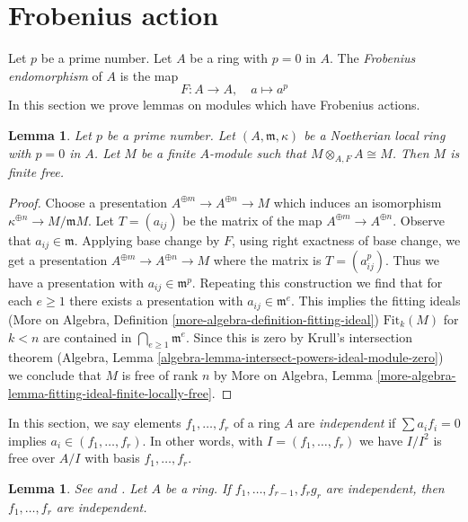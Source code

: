 \documentclass{stacks-project}
\newenvironment{reference}{\comment}{\endcomment}
\theoremstyle{plain}
\newtheorem{lemma}[subsection]{Lemma}
\theoremstyle{definition}
\theoremstyle{remark}
\numberwithin{equation}{subsection}
\begin{document}
\section{Frobenius action}
\label{section-frobenius}

\noindent
Let $p$ be a prime number. Let $A$ be a ring with $p = 0$ in $A$.
The {\it Frobenius endomorphism} of $A$ is the map
$$
F : A \longrightarrow A,
\quad
a \longmapsto a^p
$$
In this section we prove lemmas on modules which have
Frobenius actions.

\begin{lemma}
\label{lemma-annihilator-frobenius-module}
Let $p$ be a prime number. Let $(A, \mathfrak m, \kappa)$
be a Noetherian local ring
with $p = 0$ in $A$. Let $M$ be a finite $A$-module
such that $M \otimes_{A, F} A \cong M$. Then $M$ is finite free.
\end{lemma}

\begin{proof}
Choose a presentation $A^{\oplus m} \to A^{\oplus n} \to M$
which induces an isomorphism $\kappa^{\oplus n} \to M/\mathfrak m M$.
Let $T = (a_{ij})$ be the matrix of the map $A^{\oplus m} \to A^{\oplus n}$.
Observe that $a_{ij} \in \mathfrak m$. Applying base change by
$F$, using right exactness of base change, we get a presentation
$A^{\oplus m} \to A^{\oplus n} \to M$ where the matrix is
$T = (a_{ij}^p)$. Thus we have a presentation with
$a_{ij} \in \mathfrak m^p$. Repeating this construction we
find that for each $e \geq 1$ there exists a presentation with
$a_{ij} \in \mathfrak m^e$. This implies the fitting ideals
(More on Algebra, Definition \ref{more-algebra-definition-fitting-ideal})
$\text{Fit}_k(M)$ for $k < n$ are contained in
$\bigcap_{e \geq 1} \mathfrak m^e$. Since this is zero by
Krull's intersection theorem
(Algebra, Lemma \ref{algebra-lemma-intersect-powers-ideal-module-zero})
we conclude that
$M$ is free of rank $n$ by
More on Algebra, Lemma
\ref{more-algebra-lemma-fitting-ideal-finite-locally-free}.
\end{proof}

\noindent
In this section, we say elements $f_1, \ldots, f_r$ of a ring $A$
are {\it independent} if $\sum a_if_i = 0$ implies
$a_i \in (f_1, \ldots, f_r)$. In other words, with $I = (f_1, \ldots, f_r)$
we have $I/I^2$ is free over $A/I$ with basis $f_1, \ldots, f_r$.

\begin{lemma}
\label{lemma-1}
\begin{reference}
See \cite{Lech-inequalities} and \cite[Lemma 1 page 299]{MatCA}.
\end{reference}
Let $A$ be a ring. If $f_1, \ldots, f_{r - 1}, f_rg_r$
are independent, then $f_1, \ldots, f_r$ are independent.
\end{lemma}
\end{document}
